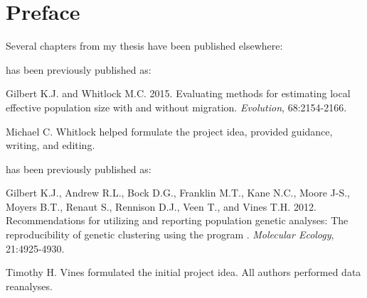 \chapter*{Preface}

Several chapters from my thesis have been published elsewhere:

\textsc{} has been previously published as:
%
\begin{previouspaper}
  Gilbert K.J. and Whitlock M.C. 2015. Evaluating methods for estimating local effective 
  population size with and without migration. \emph{Evolution}, 68:2154-2166.
\end{previouspaper}
%
Michael C. Whitlock helped formulate the project idea, provided guidance, writing, and editing.

\textsc{} has been previously published as:
%
\begin{previouspaper}
  Gilbert K.J., Andrew R.L., Bock D.G., Franklin M.T., Kane N.C., Moore J-S., Moyers B.T., Renaut S., Rennison D.J., Veen T., and Vines T.H. 2012. Recommendations for utilizing and reporting population genetic analyses: The reproducibility of genetic clustering using the program . \emph{Molecular Ecology}, 21:4925-4930.
\end{previouspaper}
%
Timothy H. Vines formulated the initial project idea. All authors performed data reanalyses.


